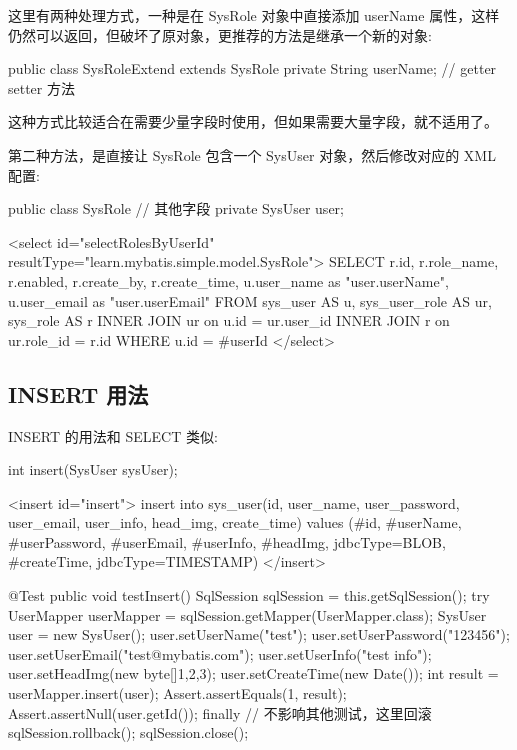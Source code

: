 这里有两种处理方式，一种是在 SysRole 对象中直接添加 userName 属性，这样仍然可以返回，但破坏了原对象，更推荐的方法是继承一个新的对象:

\begin{Java}
public class SysRoleExtend extends SysRole{
    private String userName;
    // getter setter 方法
}
\end{Java}

这种方式比较适合在需要少量字段时使用，但如果需要大量字段，就不适用了。

第二种方法，是直接让 SysRole 包含一个 SysUser 对象，然后修改对应的 XML 配置:

\begin{Java}
public class SysRole {
    // 其他字段
    private SysUser user;
}
\end{Java}

\begin{xml}
<select id="selectRolesByUserId" resultType="learn.mybatis.simple.model.SysRole">
    SELECT r.id, r.role_name, r.enabled, r.create_by, r.create_time, u.user_name as "user.userName", u.user_email as "user.userEmail"
    FROM sys_user AS u,
        sys_user_role AS ur,
        sys_role AS r
            INNER JOIN ur on u.id = ur.user_id
            INNER JOIN r on ur.role_id = r.id
    WHERE u.id = #{userId}
</select>
\end{xml}

\subsection{INSERT 用法}

INSERT 的用法和 SELECT 类似:

\begin{Java}
int insert(SysUser sysUser);
\end{Java}

\begin{xml}
<insert id="insert">
    insert into sys_user(id, user_name, user_password, user_email, user_info, head_img, create_time)
    values (#{id}, #{userName}, #{userPassword}, #{userEmail}, #{userInfo}, #{headImg, jdbcType=BLOB}, #{createTime, jdbcType=TIMESTAMP})
</insert>
\end{xml}

\begin{Java}
@Test
public void testInsert() {
    SqlSession sqlSession = this.getSqlSession();
    try {
        UserMapper userMapper = sqlSession.getMapper(UserMapper.class);
        SysUser user = new SysUser();
        user.setUserName("test");
        user.setUserPassword("123456");
        user.setUserEmail("test@mybatis.com");
        user.setUserInfo("test info");
        user.setHeadImg(new byte[]{1,2,3});
        user.setCreateTime(new Date());
        int result = userMapper.insert(user);
        Assert.assertEquals(1, result);
        Assert.assertNull(user.getId());
    } finally {
        // 不影响其他测试，这里回滚
        sqlSession.rollback();
        sqlSession.close();
    }
}
\end{Java}

